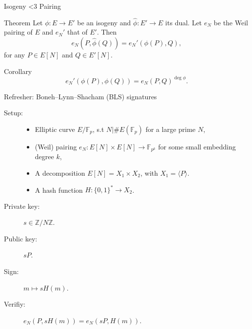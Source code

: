 \documentclass[aspectratio=169]{beamer}
\newcommand{\F}{\mathbb{F}}
\newcommand{\Z}{\mathbb{Z}}
\begin{document}

\begin{frame}{Isogeny <3 Pairing}
  \begin{block}{Theorem}
    Let \emph{$\phi:E\to E'$} be an isogeny and \emph{$\hat{\phi}:E' \to E$} its dual.
    Let \emph{$e_N$} be the Weil pairing of $E$ and \emph{$e_N'$} that
    of $E'$. %
    Then
    \[e_N(P,\hat{\phi}(Q)) = e_N'(\phi(P),Q),\]
    for any \emph{$P\in E[N]$} and \emph{$Q\in E'[N]$}.
  \end{block}
  
  \begin{block}{Corollary}
    \[e_N'(\phi(P),\phi(Q)) = e_N(P,Q)^{\deg\phi}.\]
  \end{block}
\end{frame}


\begin{frame}{Refresher: Boneh--Lynn--Shacham (BLS) signatures}
  \begin{block}{}
    \begin{description}
    \item[Setup:]
      \begin{itemize}
      \item Elliptic curve $E/\F_p$, s.t \emph{$N|\#E(\F_p)$} for a large prime $N$,
      \item (Weil) pairing \emph{$e_N:E[N]\times E[N]\to\F_{p^k}$} for
        some small embedding degree $k$,
      \item A decomposition \emph{$E[N]=X_1 \times X_2$}, with
        \emph{$X_1=\langle P\rangle$}.
      \item A hash function \emph{$H:\{0,1\}^*\to X_2$}.
      \end{itemize}
    \item[Private key:] $s\in\Z/N\Z$.
    \item[Public key:] $sP$.
    \item[Sign:] $m \mapsto sH(m)$.
    \item[Verifiy:] $e_N(P,sH(m)) = e_N(sP,H(m))$.
    \end{description}
  \end{block}

  \centering
\end{frame}
\end{document}

